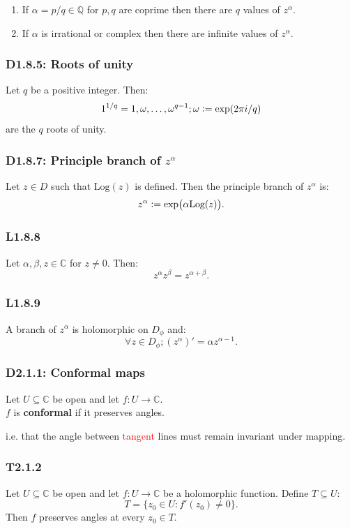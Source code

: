 \documentclass{article}
\newcommand{\deq}{\vcentcolon=}
\begin{document}
\begin{multicols*}{3}
\begin{enumerate}
    \item If $\alpha=p/q\in\mathbb{Q}$ for $p,q$ are coprime
    then there are $q$ values of $z^{\alpha}$.

    \item If $\alpha$ is irrational or complex
    then there are infinite values of $z^{\alpha}$.
\end{enumerate}

\subsubsection*{D1.8.5: Roots of unity}
Let $q$ be a positive integer. Then:
$$1^{1/q}=1,\omega,\dots,\omega^{q-1};
\omega\deq\exp(2\pi i/q)$$
are the $q$ roots of unity.

\subsubsection*{D1.8.7: Principle branch of $z^{\alpha}$}
Let $z\in D$ such that $\text{Log}(z)$ is defined.
Then the principle branch of $z^{\alpha}$ is:
$$z^{\alpha}\deq\exp\bigl(\alpha\text{Log}(z)\bigr).$$

\subsubsection*{L1.8.8}
Let $\alpha,\beta,z\in\mathbb{C}$ for $z\neq0$. Then:
$$z^{\alpha}z^{\beta}=z^{\alpha+\beta}.$$

\subsubsection*{L1.8.9}
A branch of $z^{\alpha}$ is holomorphic on $D_{\phi}$ and:
$$\forall z\in D_{\phi};(z^{\alpha})'=\alpha z^{\alpha-1}.$$

\subsubsection*{D2.1.1: Conformal maps}
Let $U\subseteq\mathbb{C}$ be open and
let $f:U\rightarrow\mathbb{C}$. \\
$f$ is \textbf{conformal} if it preserves angles.

i.e. that the angle between \textcolor{red}{tangent} lines
must remain invariant under mapping.

\subsubsection*{T2.1.2}
Let $U\subseteq\mathbb{C}$ be open and
let $f:U\rightarrow\mathbb{C}$ be a holomorphic function.
Define $T\subseteq U$:
$$T=\{z_0\in U:f'(z_0)\neq0\}.$$
Then $f$ preserves angles at every $z_0\in T$.


\end{multicols*}
\end{document}
